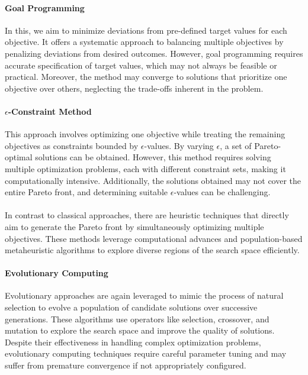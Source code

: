 \paragraph{Goal Programming}
In this, we aim to minimize deviations from pre-defined target values for each objective.
It offers a systematic approach to balancing multiple objectives by penalizing deviations from desired outcomes.
However, goal programming requires accurate specification of target values, which may not always be feasible or practical. Moreover, the method may converge to solutions that prioritize one objective over others, neglecting the trade-offs inherent in the problem.

\paragraph{$\epsilon$-Constraint Method}
This approach involves optimizing one objective while treating the remaining objectives as constraints bounded by $\epsilon$-values.
By varying $\epsilon$, a set of Pareto-optimal solutions can be obtained. However, this method requires solving multiple optimization problems, each with different constraint sets, making it computationally intensive.
Additionally, the solutions obtained may not cover the entire Pareto front, and determining suitable $\epsilon$-values can be challenging.
\\
\\

In contrast to classical approaches, there are heuristic techniques that directly aim to generate the Pareto front by simultaneously optimizing multiple objectives. These methods leverage computational advances and population-based metaheuristic algorithms to explore diverse regions of the search space efficiently.

\paragraph{Evolutionary Computing} Evolutionary approaches are again leveraged to mimic the process of natural selection to evolve a population of candidate solutions over successive generations.
These algorithms use operators like selection, crossover, and mutation to explore the search space and improve the quality of solutions. Despite their effectiveness in handling complex optimization problems, evolutionary computing techniques require careful parameter tuning and may suffer from premature convergence if not appropriately configured.

